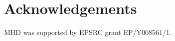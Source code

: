 \documentclass{article}
\newcommand{\md}[1]{{\color{red}Hong:  #1}}
\begin{document}
\section*{Acknowledgements}
MHD was supported by EPSRC grant EP/Y008561/1. 










\printbibliography
\end{document}
